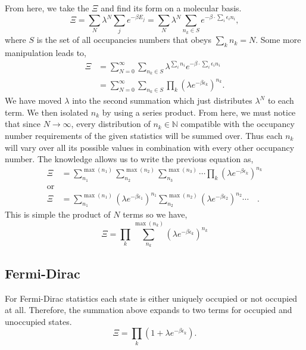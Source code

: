 From here, we take the $\Xi$ and find its form on a molecular basis.
\begin{equation*}
	\Xi = \sum_N{\lambda^{N}} \sum_j{e^{-\beta E_j}} =
	\sum_N{\lambda^{N}}\sum_{n_k \in S}{e^{-\beta \cdot \sum_i{\epsilon_i n_i}}},
\end{equation*}
where $S$ is the set of all occupancies numbers that obeys $\sum_k{n_k} = N$.
Some more manipulation leads to,
\begin{align*}
	\Xi &= \sum_{N=0}^{\infty} \sum_{n_k \in S}{\lambda^{\sum_i{n_i}} e^{-\beta
	\cdot \sum_i{\epsilon_i n_i}}}\\
		&= \sum_{N=0}^{\infty} \sum_{n_k \in S} \prod_k{(\lambda e^{-\beta
		\epsilon_k})^{n_k}}.
\end{align*}
We have moved $\lambda$ into the second summation which just distributes
$\lambda^{N}$ to each term. We then isolated $n_k$ by using a series product.
From here, we must notice that since $N \to \infty$, every distribution of $n_k
\in \mathbb{N}$ compatible with the occupancy number requirements of the given
statistics will be summed over. Thus each $n_k$ will vary over all its possible values in
combination with every other occupancy number. The knowledge allows us to write
the previous equation as,
\begin{align*}
	\Xi &= \sum_{n_1}^{\max(n_1)} \sum_{n_2}^{\max(n_2)} \sum_{n_3}^{\max(n_3)}
	\cdots \prod_k{(\lambda e^{-\beta \epsilon_k})^{n_k}}\\
	\text{or}\\
	\Xi &= \sum_{n_1}^{\max(n_1)}{(\lambda e^{-\beta \epsilon_1})^{n_1}}
	\sum_{n_2}^{\max(n_2)}{(\lambda e^{-\beta \epsilon_2})^{n_2}}\cdots\quad.
\end{align*}
This is simple the product of $N$ terms so we have,
\begin{equation*}
	\Xi = \prod_k \sum_{n_k}^{\max(n_k)}{(\lambda e^{-\beta \epsilon_k})^{n_k}}
\end{equation*}

\subsection{Fermi-Dirac}
For Fermi-Dirac statistics each state is either uniquely occupied or not
occupied at all. Therefore, the summation above expands to two terms for
occupied and unoccupied states.
\begin{equation*}
	\Xi = \prod_k (1 + \lambda e^{-\beta \epsilon_k}).
\end{equation*}
